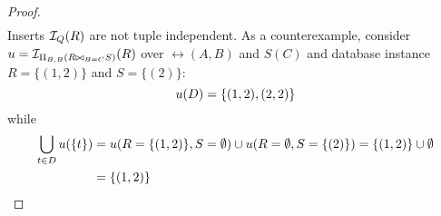 \begin{proof}
\begin{align*}
    \end{align*}
    Inserts $\mathcal{I}_{Q}(R)$ are not tuple independent. As a counterexample, consider $u = \mathcal{I}_{\Pi_{B,B}(R \bowtie_{B=C} S)}(R)$ over $\rel(A,B)$ and $S(C)$ and database instance $R = \{(1,2)\}$ and $S = \{(2)\}$:
    \[
      u(D) = \{ (1,2), (2,2) \}
    \]
    while
    \begin{align*}
      \bigcup_{t \in D} u(\{t\}) &= u(R=\{(1,2)\},S=\emptyset) \cup u(R=\emptyset,S=\{(2)\}) = \{(1,2)\} \cup \emptyset\\
                                       &= \{(1,2)\}
    \end{align*}
    \end{proof}



